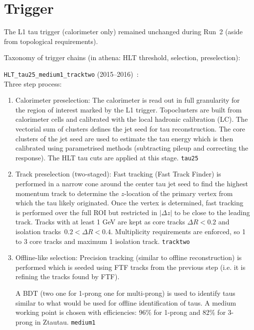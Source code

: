 \section{Trigger}
\label{sec:exp_trigger}


The L1 tau trigger (calorimeter only) remained unchanged during Run~2
(aside from topological requirements).

Taxonomy of trigger chains (in athena: HLT threshold, selection, preselection):

\vspace{1em}

\verb|HLT_tau25_medium1_tracktwo| (2015--2016)~\cite{ATLAS-CONF-2017-061}:\\
Three step process:
\begin{enumerate}
\item Calorimeter preselection: The calorimeter is read out in full
  granularity for the region of interest marked by the L1
  trigger. Topoclusters are built from calorimeter cells and
  calibrated with the local hadronic calibration (LC). The vectorial
  sum of clusters defines the jet seed for tau reconstruction. The
  core clusters of the jet seed are used to estimate the tau energy
  which is then calibrated using parametrised methods (subtracting
  pileup and correcting the response). The HLT tau \pT cuts are
  applied at this stage. \verb|tau25|

\item Track preselection (two-staged): Fast tracking (Fast Track
  Finder) is performed in a narrow cone around the center tau jet seed
  to find the highest momentum track to determine the $z$-location of
  the primary vertex from which the tau likely originated. Once the
  vertex is determined, fast tracking is performed over the full ROI
  but restricted in $|\Delta z|$ to be close to the leading
  track. Tracks with at least 1 GeV are kept as core tracks
  $\Delta R < 0.2$ and isolation tracks~$0.2 < \Delta R <
  0.4$. Multiplicity requirements are enforced, so 1 to 3 core tracks
  and maximum 1 isolation track. \verb|tracktwo|

\item Offline-like selection: Precision tracking (similar to offline
  reconstruction) is performed which is seeded using FTF tracks from
  the previous step (i.e. it is refining the tracks found by FTF).


  A BDT (two one for
  1-prong one for multi-prong) is used to identify taus similar to
  what would be used for offline identification of taus. A medium
  working point is chosen with efficiencies: 96\% for 1-prong and 82\%
  for 3-prong in Ztautau. \verb|medium1|
\end{enumerate}

